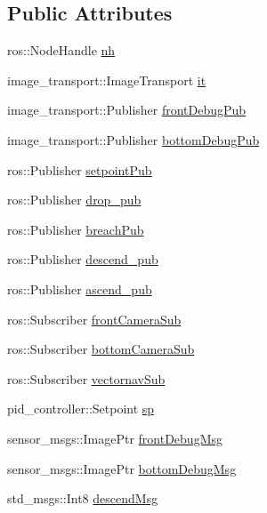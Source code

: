 \subsection*{Public Attributes}
\begin{DoxyCompactItemize}
\item 
ros\+::\+Node\+Handle \hyperlink{classPathPlanner_a3728ed52563a28d32c19efc157771e96}{nh}
\item 
image\+\_\+transport\+::\+Image\+Transport \hyperlink{classPathPlanner_afdf6f6e68086d7992206f84d37b56c84}{it}
\item 
image\+\_\+transport\+::\+Publisher \hyperlink{classPathPlanner_a8a5f65b9ca4a6ddd19e046c46ad7e349}{front\+Debug\+Pub}
\item 
image\+\_\+transport\+::\+Publisher \hyperlink{classPathPlanner_aae9f1307dab87b0979497f41553dc34e}{bottom\+Debug\+Pub}
\item 
ros\+::\+Publisher \hyperlink{classPathPlanner_ac2cd91552262491438a806f3229fe5f8}{setpoint\+Pub}
\item 
ros\+::\+Publisher \hyperlink{classPathPlanner_a5950dcdaa13fde281ad87bc06bb4221c}{drop\+\_\+pub}
\item 
ros\+::\+Publisher \hyperlink{classPathPlanner_a6ad35bcf1143889a2273362476028445}{breach\+Pub}
\item 
ros\+::\+Publisher \hyperlink{classPathPlanner_af0db2ddfb46fd54f8c8b942b44f67e75}{descend\+\_\+pub}
\item 
ros\+::\+Publisher \hyperlink{classPathPlanner_a8afd938d26553fae883bd02ed0d44458}{ascend\+\_\+pub}
\item 
ros\+::\+Subscriber \hyperlink{classPathPlanner_ae5bf7f525a1723eef45c2887e8b3fbae}{front\+Camera\+Sub}
\item 
ros\+::\+Subscriber \hyperlink{classPathPlanner_a180b062cc5656e45a1f789689cc5d130}{bottom\+Camera\+Sub}
\item 
ros\+::\+Subscriber \hyperlink{classPathPlanner_a0527b6b13cdffd139aa4e2acbcb8cc32}{vectornav\+Sub}
\item 
pid\+\_\+controller\+::\+Setpoint \hyperlink{classPathPlanner_a6b892ed37642ddc634c9dd245f20ca40}{sp}
\item 
sensor\+\_\+msgs\+::\+Image\+Ptr \hyperlink{classPathPlanner_a54f52fe7a3bad416e15f326b807692e2}{front\+Debug\+Msg}
\item 
sensor\+\_\+msgs\+::\+Image\+Ptr \hyperlink{classPathPlanner_a351514e893a8b37984aa678f6ede8211}{bottom\+Debug\+Msg}
\item 
std\+\_\+msgs\+::\+Int8 \hyperlink{classPathPlanner_ad7a30801fb56f1f2a5bf02d99b21ca5a}{descend\+Msg}

\end{DoxyCompactItemize}
